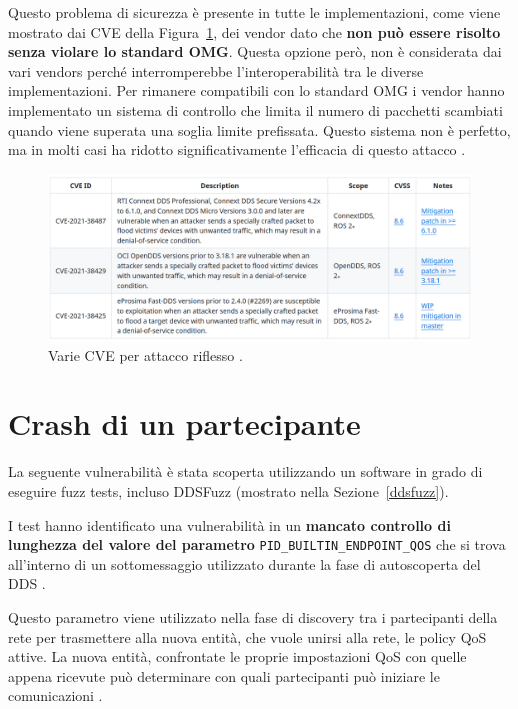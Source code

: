 Questo problema di sicurezza è presente in tutte le implementazioni,
come viene mostrato dai CVE della Figura~\ref{CVErecoinnassance},
dei vendor dato che \textbf{non può essere risolto senza violare lo 
standard OMG}. Questa opzione però, non è considerata dai vari 
vendors perché interromperebbe l'interoperabilità tra le 
diverse implementazioni.
Per rimanere compatibili con lo standard OMG i vendor hanno 
implementato un sistema di controllo che limita il numero 
di pacchetti scambiati quando viene superata una soglia limite
prefissata. Questo sistema non è perfetto, ma in molti casi ha 
ridotto significativamente 
l'efficacia di questo attacco \cite{mayoral2022robot}.

\begin{figure}[H]
    \centering
    \includegraphics[width=15.2cm, keepaspectratio]{img/CVErecoinnassance.png}
    \caption{Varie CVE per attacco riflesso \cite{mayoral2022robot}.}
    \label{CVErecoinnassance}
\end{figure}


\section{Crash di un partecipante}
La seguente vulnerabilità è stata scoperta utilizzando 
un software in grado di eseguire fuzz tests, 
incluso DDSFuzz (mostrato nella Sezione~\ref{ddsfuzz}).

I test hanno identificato una vulnerabilità in un \textbf{mancato 
controllo di lunghezza del valore del parametro} 
\texttt{PID\_BUILTIN\_ENDPOINT\_QOS} che si trova all'interno di 
un sottomessaggio utilizzato durante la fase di autoscoperta
del DDS \cite{mayoral2022robot}. 

Questo parametro viene 
utilizzato nella fase di discovery
tra i partecipanti della rete per trasmettere
alla nuova entità, che vuole unirsi alla rete, le policy
QoS attive. La nuova entità, confrontate 
le proprie impostazioni QoS con quelle appena ricevute
può determinare con quali partecipanti può iniziare le 
comunicazioni \cite{ddsrtps}.

